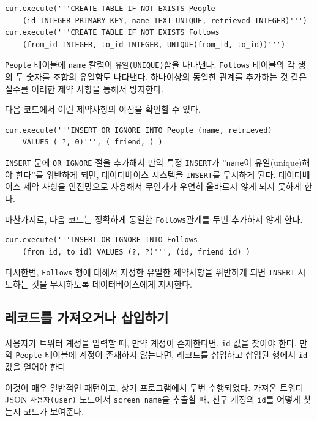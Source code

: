 \beforeverb
\begin{verbatim}
cur.execute('''CREATE TABLE IF NOT EXISTS People 
    (id INTEGER PRIMARY KEY, name TEXT UNIQUE, retrieved INTEGER)''')
cur.execute('''CREATE TABLE IF NOT EXISTS Follows 
    (from_id INTEGER, to_id INTEGER, UNIQUE(from_id, to_id))''')
\end{verbatim}
\afterverb
%

{\tt People} 테이블에 {\tt name} 칼럼이 {\tt 유일(UNIQUE)}함을 나타낸다.
{\tt Follows} 테이블의 각 행의 두 숫자를 조합의 유일함도 나타낸다.
하나이상의 동일한 관계를 추가하는 것 같은 실수를 이러한 제약 사항을 통해서 방지한다.

다음 코드에서 이런 제약사항의 이점을 확인할 수 있다.

\beforeverb
\begin{verbatim}
cur.execute('''INSERT OR IGNORE INTO People (name, retrieved) 
    VALUES ( ?, 0)''', ( friend, ) )
\end{verbatim}
\afterverb
%

{\tt INSERT} 문에 {\tt OR IGNORE} 절을 추가해서 만약 특정 {\tt INSERT}가 
''{\tt name}이 유일(unique)해야 한다''를 위반하게 되면, 데이터베이스 시스템을 {\tt INSERT}를 무시하게 된다.
데이터베이스 제약 사항을 안전망으로 사용해서 무언가가 우연히 올바르지 않게 되지 못하게 한다.

마찬가지로, 다음 코드는 정확하게 동일한 {\tt Follows}관계를 두번 추가하지 않게 한다.

\beforeverb
\begin{verbatim}
cur.execute('''INSERT OR IGNORE INTO Follows 
    (from_id, to_id) VALUES (?, ?)''', (id, friend_id) )
\end{verbatim}
\afterverb
%

다시한번, {\tt Follows} 행에 대해서 지정한 유일한 제약사항을 위반하게 되면 {\tt INSERT} 시도하는 것을 무시하도록
데이터베이스에게 지시한다.

\subsection{레코드를 가져오거나 삽입하기}

사용자가 트위터 계정을 입력할 때, 만약 계정이 존재한다면, {\tt id} 값을 찾아야 한다.
만약 {\tt People} 테이블에 계정이 존재하지 않는다면, 레코드를 삽입하고 삽입된 행에서 {\tt id} 값을 얻어야 한다.

이것이 매우 일반적인 패턴이고, 상기 프로그램에서 두번 수행되었다. 가져온 트위터 JSON {\tt 사용자(user)} 노드에서 
\verb"screen_name"을 추출할 때, 친구 계정의 {\tt id}를 어떻게 찾는지 코드가 보여준다.

